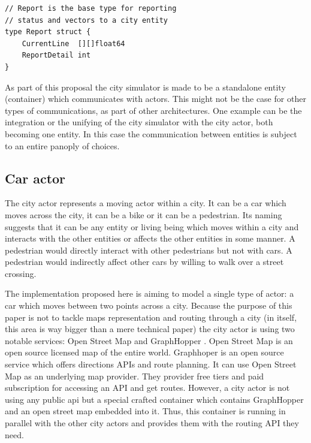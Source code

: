 \documentclass[conference]{IEEEtran}
\begin{document}
\begin{lstlisting}[caption=Go struct for actor's report, label=lst:goactorstruct]
// Report is the base type for reporting
// status and vectors to a city entity
type Report struct {
	CurrentLine  [][]float64
	ReportDetail int
}
\end{lstlisting}

As part of this proposal the city simulator is made to be a standalone entity (container) which communicates with actors. This might not be the case for other types of communications, as part of other architectures. One example can be the integration or the unifying of the city simulator with the city actor, both becoming one entity. In this case the communication between entities is subject to an entire panoply of choices.

\subsection{Car actor}

The city actor represents a moving actor within a city. It can be a car which moves across the city, it can be a bike or it can be a pedestrian. Its naming suggests that it can be any entity or living being which moves within a city and interacts with the other entities or affects the other entities in some manner. A pedestrian would directly interact with other pedestrians but not with cars. A pedestrian would indirectly affect other cars by willing to walk over a street crossing.

The implementation proposed here is aiming to model a single type of actor: a car which moves between two points across a city. Because the purpose of this paper is not to tackle maps representation and routing through a city (in itself, this area is way bigger than a mere technical paper) the city actor is using two notable services: Open Street Map \cite{openstreetmap} and GraphHopper \cite{graphhopper}. Open Street Map is an open source licensed map of the entire world. Graphhoper is an open source service which offers directions APIs and route planning. It can use Open Street Map as an underlying map provider. They provider free tiers and paid subscription for accessing an API and get routes. However, a city actor is not using any public api but a special crafted container which contains GraphHopper and an open street map embedded into it. Thus, this container is running in parallel with the other city actors and provides them with the routing API they need.
\end{document}
